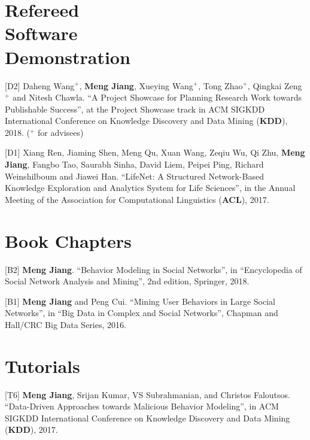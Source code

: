 \documentclass[margin, 9pt]{res}
\begin{document}
\begin{resume}
\section{Refereed \\ Software \\ Demonstration}

[D2] Daheng Wang${}^{+}$, \textbf{Meng Jiang}, Xueying Wang${}^{+}$, Tong Zhao${}^{+}$, Qingkai Zeng${}^{+}$ and Nitesh Chawla. ``A Project Showcase for Planning Research Work towards Publishable Success'', at the Project Showcase track in ACM SIGKDD International Conference on Knowledge Discovery and Data Mining (\textbf{KDD}), 2018. (${}^{+}$ for advisees)

[D1] Xiang Ren, Jiaming Shen, Meng Qu, Xuan Wang, Zeqiu Wu, Qi Zhu, \textbf{Meng Jiang}, Fangbo Tao, Saurabh Sinha, David Liem, Peipei Ping, Richard Weinshilboum and Jiawei Han. ``LifeNet: A Structured Network-Based Knowledge Exploration and Analytics System for Life Sciences'', in the Annual Meeting of the Association for Computational Linguistics (\textbf{ACL}), 2017.


\section{Book Chapters}

[B2] \textbf{Meng Jiang}. ``Behavior Modeling in Social Networks'', in ``Encyclopedia of Social Network Analysis and Mining'', 2nd edition, Springer, 2018.

[B1] \textbf{Meng Jiang} and Peng Cui. ``Mining User Behaviors in Large Social Networks'', in ``Big Data in Complex and Social Networks'', Chapman and Hall/CRC Big Data Series, 2016.


\section{Tutorials}

[T6] \textbf{Meng Jiang}, Srijan Kumar, VS Subrahmanian, and Christos Faloutsos. ``Data-Driven Approaches towards Malicious Behavior Modeling'', in ACM SIGKDD International Conference on Knowledge Discovery and Data Mining (\textbf{KDD}), 2017.


\end{resume}
\end{document}
